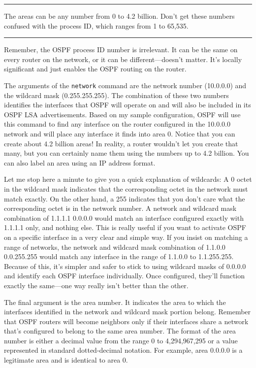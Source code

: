 \begin{center}\rule{0.5\linewidth}{0.5pt}\end{center}

The areas can be any number from 0 to
4.2 billion. Don't get these numbers confused with the process ID, which
ranges from 1 to 65,535.

\begin{center}\rule{0.5\linewidth}{0.5pt}\end{center}

Remember, the OSPF process ID number is irrelevant. It can be the same
on every router on the network, or it can be different---doesn't matter.
It's locally significant and just enables the OSPF routing on the
router.

The arguments of the \texttt{network} command are the network number
(10.0.0.0) and the wildcard mask (0.255.255.255). The combination of
these two numbers identifies the interfaces that OSPF will operate on
and will also be included in its OSPF LSA advertisements. Based on my
sample configuration, OSPF will use this command to find any interface
on the router configured in the 10.0.0.0 network and will place any
interface it finds into area 0.
\protect\hypertarget{c18.xhtmlux5cux23Page_755}{}{}Notice that you can
create about 4.2 billion areas! In reality, a router wouldn't let you
create that many, but you can certainly name them using the numbers up
to 4.2 billion. You can also label an area using an IP address format.

Let me stop here a minute to give you a quick explanation of wildcards:
A 0 octet in the wildcard mask indicates that the corresponding octet in
the network must match exactly. On the other hand, a 255 indicates that
you don't care what the corresponding octet is in the network number. A
network and wildcard mask combination of 1.1.1.1 0.0.0.0 would match an
interface configured exactly with 1.1.1.1 only, and nothing else. This
is really useful if you want to activate OSPF on a specific interface in
a very clear and simple way. If you insist on matching a range of
networks, the network and wildcard mask combination of 1.1.0.0
0.0.255.255 would match any interface in the range of 1.1.0.0 to
1.1.255.255. Because of this, it's simpler and safer to stick to using
wildcard masks of 0.0.0.0 and identify each OSPF interface individually.
Once configured, they'll function exactly the same---one way really
isn't better than the other.

The final argument is the area number. It indicates the area to which
the interfaces identified in the network and wildcard mask portion
belong. Remember that OSPF routers will become neighbors only if their
interfaces share a network that's configured to belong to the same area
number. The format of the area number is either a decimal value from the
range 0 to 4,294,967,295 or a value represented in standard
dotted-decimal notation. For example, area 0.0.0.0 is a legitimate area
and is identical to area 0.

